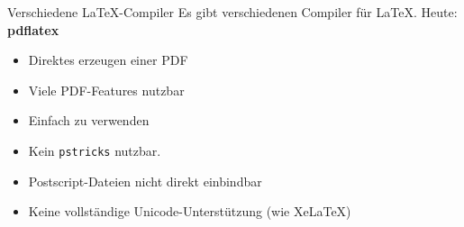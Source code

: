 \documentclass{beamer}
\begin{document}
		\begin{frame}{Verschiedene \LaTeX{}-Compiler}
			Es gibt verschiedenen Compiler für \LaTeX{}. Heute: \textbf{pdflatex}
			\begin{itemize}
				\item Direktes erzeugen einer PDF
				\item Viele PDF-Features nutzbar
				\item Einfach zu verwenden
			\end{itemize}
			\begin{itemize}
				\item Kein \texttt{pstricks} nutzbar.
				\item Postscript-Dateien nicht direkt einbindbar
				\item Keine vollständige Unicode-Unterstützung (wie Xe\LaTeX)
			\end{itemize}
		\end{frame}
		
		
\end{document}
